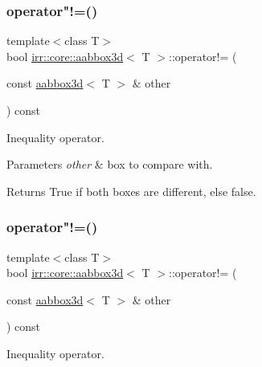 \subsubsection{\texorpdfstring{operator"!=()}{operator!=()}\hspace{0.1cm}{\footnotesize\ttfamily [1/2]}}
{\footnotesize\ttfamily template$<$class T$>$ \\
bool \hyperlink{classirr_1_1core_1_1aabbox3d}{irr\+::core\+::aabbox3d}$<$ T $>$\+::operator!= (\begin{DoxyParamCaption}\item[{const \hyperlink{classirr_1_1core_1_1aabbox3d}{aabbox3d}$<$ T $>$ \&}]{other }\end{DoxyParamCaption}) const\hspace{0.3cm}{\ttfamily [inline]}}



Inequality operator. 


\begin{DoxyParams}{Parameters}
{\em other} & box to compare with. \\
\hline
\end{DoxyParams}
\begin{DoxyReturn}{Returns}
True if both boxes are different, else false. 
\end{DoxyReturn}
\mbox{\label{classirr_1_1core_1_1aabbox3d_a985eec4fb632d7c8ef5a5577209690b3}} 
\subsubsection{\texorpdfstring{operator"!=()}{operator!=()}\hspace{0.1cm}{\footnotesize\ttfamily [2/2]}}
{\footnotesize\ttfamily template$<$class T$>$ \\
bool \hyperlink{classirr_1_1core_1_1aabbox3d}{irr\+::core\+::aabbox3d}$<$ T $>$\+::operator!= (\begin{DoxyParamCaption}\item[{const \hyperlink{classirr_1_1core_1_1aabbox3d}{aabbox3d}$<$ T $>$ \&}]{other }\end{DoxyParamCaption}) const\hspace{0.3cm}{\ttfamily [inline]}}



Inequality operator. 



